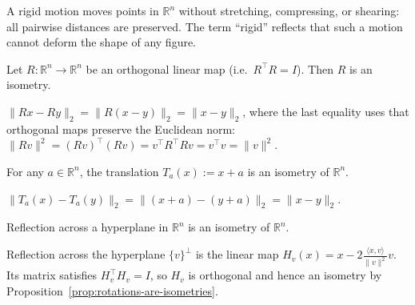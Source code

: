 

\begin{remark*}[Intuition]
A rigid motion moves points in $\mathbb{R}^n$ without stretching,
compressing, or shearing: all pairwise distances are preserved.
The term ``rigid'' reflects that such a motion cannot deform the shape
of any figure.
\end{remark*}

\begin{proposition}
\label{prop:rotations-are-isometries}
Let $R : \mathbb{R}^n \to \mathbb{R}^n$ be an orthogonal linear map
(i.e.\ $R^\top R = I$). Then $R$ is an isometry.
\end{proposition}

\begin{remark*}
$\|Rx - Ry\|_2 = \|R(x-y)\|_2 = \|x-y\|_2$,
where the last equality uses that orthogonal maps preserve the Euclidean norm:
$\|Rv\|^2 = (Rv)^\top(Rv) = v^\top R^\top R v = v^\top v = \|v\|^2$.
\end{remark*}

\begin{proposition}
\label{prop:translations-are-isometries}
For any $a \in \mathbb{R}^n$, the translation $T_a(x) := x + a$
is an isometry of $\mathbb{R}^n$.
\end{proposition}

\begin{remark*}
$\|T_a(x) - T_a(y)\|_2 = \|(x+a)-(y+a)\|_2 = \|x-y\|_2$.
\end{remark*}

\begin{proposition}
\label{prop:reflections-are-isometries}
Reflection across a hyperplane in $\mathbb{R}^n$ is an isometry of
$\mathbb{R}^n$.
\end{proposition}

\begin{remark*}
Reflection across the hyperplane $\{v\}^\perp$ is the linear map
$H_v(x) = x - 2\frac{\langle x,v\rangle}{\|v\|^2}v$.
Its matrix satisfies $H_v^\top H_v = I$, so $H_v$ is orthogonal and
hence an isometry by Proposition~\ref{prop:rotations-are-isometries}.
\end{remark*}

